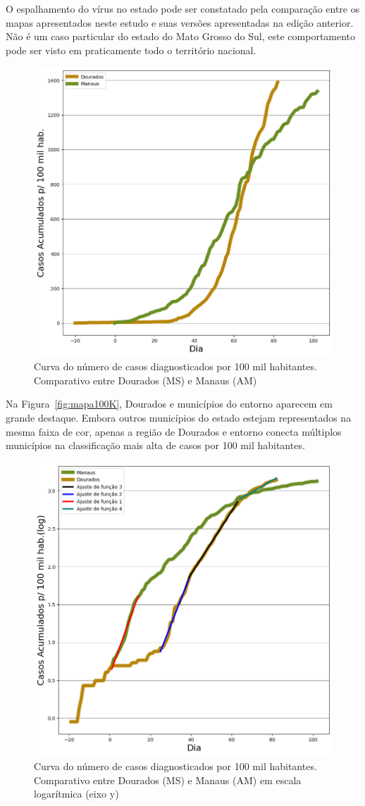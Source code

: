 \documentclass[12pt]{article}
\begin{document}
O espalhamento do vírus no estado pode ser constatado pela comparação entre os mapas apresentados neste estudo e suas versões apresentadas na edição anterior. Não é um caso particular do estado do Mato Grosso do Sul, este comportamento pode ser visto em praticamente todo o território nacional.

\begin{figure}[!htb]
  \centering
  \includegraphics[width=.5\textwidth]{figs/Dourados_Manaus_casos.png}
  \caption{Curva do número de casos diagnosticados por 100 mil habitantes. Comparativo entre Dourados (MS) e Manaus (AM)}
  \label{fig:curva100K}
  \end{figure}

Na Figura~\ref{fig:mapa100K}, Dourados e municípios do entorno aparecem em grande destaque. Embora outros municípios do estado estejam representados na mesma faixa de cor, apenas a região de Dourados e entorno conecta múltiplos municípios na classificação mais alta de casos por 100 mil habitantes.

\begin{figure}[!htb]
  \centering
  \includegraphics[width=.5\textwidth]{figs/Dourados_Manaus_casos_log.png}
  \caption{Curva do número de casos diagnosticados por 100 mil habitantes. Comparativo entre Dourados (MS) e Manaus (AM) em escala logarítmica (eixo y)}
  \label{fig:curva100KLog}
  \end{figure}
\end{document}
